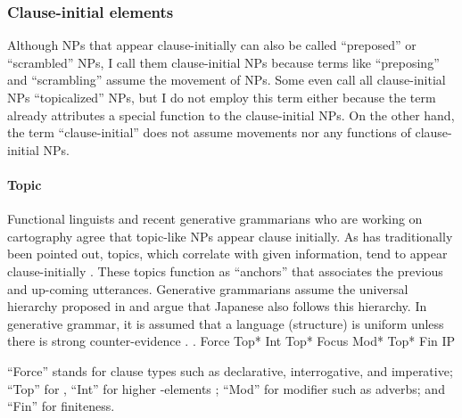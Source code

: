 
\subsubsection{Clause-initial elements}

Although NPs that appear clause-initially can also be called
``preposed'' or ``scrambled'' NPs,
I call them clause-initial NPs
because terms like ``preposing'' and ``scrambling'' assume
the movement of NPs.
Some even call all clause-initial NPs ``topicalized'' NPs,
but I do not employ this term either because
the term already attributes a special function to the clause-initial NPs.
On the other hand, the term ``clause-initial'' does not assume movements
nor any functions of clause-initial NPs.

\paragraph{Topic}

Functional linguists and recent generative grammarians who are working on cartography agree that topic-like NPs appear clause initially.
As has traditionally been pointed out,
topics, which correlate with given information,
tend to appear clause-initially
\cite{mathesius28,firbas64,danes70,kuno78}.
These topics function as ``anchors''
that associates the previous and up-coming utterances.
Generative grammarians \cite[e.g.,][]{endo14} assume the universal hierarchy \Next proposed in 
and argue that Japanese also follows this hierarchy.
In generative grammar,
it is assumed that a language (structure) is uniform
unless there is strong counter-evidence
\cite[the Uniformity Principle:][2]{chomsky01}.
%
 \ex. Force Top* Int Top* Focus Mod* Top* Fin IP
    \hfill{\cite[242]{rizzi04}}

``Force'' stands for clause types such as declarative, interrogative, and imperative;
``Top'' for ,
``Int'' for higher -elements \cite{rizzi01};
``Mod'' for modifier such as adverbs; and
``Fin'' for finiteness.


